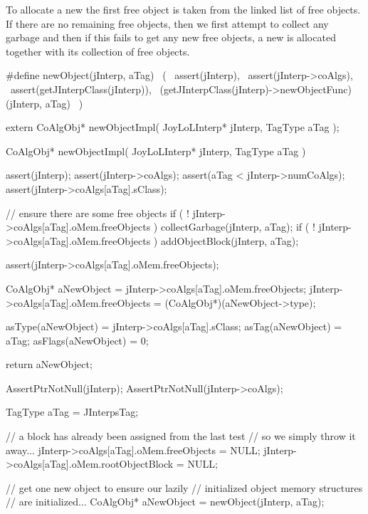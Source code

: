 \startTestSuite[newObject]

To allocate a new  the first free object is taken from 
the linked list of free objects. If there are no remaining free objects, 
then we first attempt to collect any garbage and then if this fails to get 
any new free objects, a new  is allocated together with 
its collection of free objects. 

\startCHeader
#define newObject(jInterp, aTag)                              \
  (                                                           \
    assert(jInterp),                                          \
    assert(jInterp->coAlgs),                                  \
    assert(getJInterpClass(jInterp)),                         \
    (getJInterpClass(jInterp)->newObjectFunc)(jInterp, aTag)  \
  )
\stopCHeader

\setCHeaderStream{private}
\startCHeader
extern CoAlgObj* newObjectImpl(
  JoyLoLInterp* jInterp,
  TagType aTag
);
\stopCHeader
{}

\startCCode
CoAlgObj* newObjectImpl(
  JoyLoLInterp* jInterp,
  TagType aTag
) {
  assert(jInterp);
  assert(jInterp->coAlgs);
  assert(aTag < jInterp->numCoAlgs);
  assert(jInterp->coAlgs[aTag].sClass);
  
  // ensure there are some free objects
  if ( ! jInterp->coAlgs[aTag].oMem.freeObjects ) 
    collectGarbage(jInterp, aTag);
  if ( ! jInterp->coAlgs[aTag].oMem.freeObjects )
    addObjectBlock(jInterp, aTag);

  assert(jInterp->coAlgs[aTag].oMem.freeObjects);

  CoAlgObj* aNewObject   = jInterp->coAlgs[aTag].oMem.freeObjects;
  jInterp->coAlgs[aTag].oMem.freeObjects = (CoAlgObj*)(aNewObject->type);

  asType(aNewObject)  = jInterp->coAlgs[aTag].sClass;
  asTag(aNewObject)   = aTag;
  asFlags(aNewObject) = 0;

  return aNewObject;
}
\stopCCode

\startTestCase[Allocate one new CoAlgObj]
\startCTest
  AssertPtrNotNull(jInterp);
  AssertPtrNotNull(jInterp->coAlgs);

  TagType aTag = JInterpsTag;
  
  // a block has already been assigned from the last test
  // so we simply throw it away...
  jInterp->coAlgs[aTag].oMem.freeObjects = NULL;
  jInterp->coAlgs[aTag].oMem.rootObjectBlock = NULL;

  // get one new object to ensure our lazily
  // initialized object memory structures 
  // are initialized...
  CoAlgObj* aNewObject = newObject(jInterp, aTag);
  
